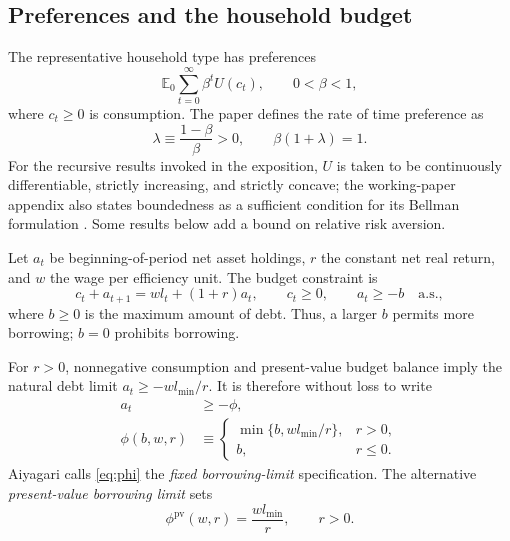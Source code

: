 \documentclass[11pt]{article}
\theoremstyle{propertystyle}
\newcommand{\E}{\mathbb{E}}
\newcommand{\1}{\mathbf{1}}
\newcommand{\as}{\text{a.s.}}
\begin{document}
\subsection{Preferences and the household budget}

The representative household type has preferences
\begin{equation}
  \E_0\sum_{t=0}^{\infty}\beta^t U(c_t),
  \qquad 0<\beta<1,
  \label{eq:utility}
\end{equation}
where $c_t\geq 0$ is consumption.  The paper defines the rate of time
preference as
\begin{equation}
  \lambda\equiv\frac{1-\beta}{\beta}>0,
  \qquad \beta(1+\lambda)=1.
  \label{eq:lambda}
\end{equation}
For the recursive results invoked in the exposition, $U$ is taken to be
continuously differentiable, strictly increasing, and strictly concave; the
working-paper appendix also states boundedness as a sufficient condition for
its Bellman formulation \cite[p.~12, n.~17]{aiyagari1993a}.  Some results below
add a bound on relative risk aversion.

Let $a_t$ be beginning-of-period net asset holdings, $r$ the constant net real
return, and $w$ the wage per efficiency unit.  The budget constraint is
\begin{equation}
  c_t+a_{t+1}=w l_t+(1+r)a_t,
  \qquad c_t\geq0, \qquad a_t\geq-b \quad \as,
  \label{eq:budget}
\end{equation}
where $b\geq0$ is the maximum amount of debt.  Thus, a larger $b$ permits more
borrowing; $b=0$ prohibits borrowing.

For $r>0$, nonnegative consumption and present-value budget balance imply the
natural debt limit $a_t\geq-wl_{\min}/r$.  It is therefore without loss to write
\begin{align}
  a_t&\geq-\phi, \label{eq:effective-limit}\\
  \phi(b,w,r)&\equiv
  \begin{cases}
    \min\{b,wl_{\min}/r\},&r>0,\\
    b,&r\leq0.
  \end{cases}
  \label{eq:phi}
\end{align}
Aiyagari calls \cref{eq:phi} the \emph{fixed borrowing-limit} specification.
The alternative \emph{present-value borrowing limit} sets
\begin{equation}
  \phi^{\mathrm{pv}}(w,r)=\frac{w l_{\min}}{r}, \qquad r>0.
  \label{eq:pv-limit}
\end{equation}
\end{document}
